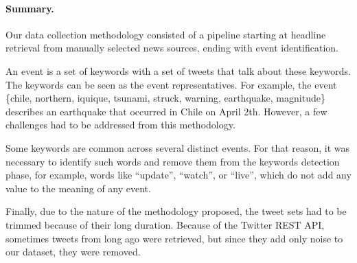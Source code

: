 \paragraph{Summary.}
%
Our data collection methodology consisted of a pipeline starting at headline
retrieval from manually selected news sources, ending with event identification.

An event is a set of keywords with a set of tweets that talk about these
keywords.
%
The keywords can be seen as the event representatives. 
%
For example, the event \{chile, northern, iquique, tsunami, struck, warning,
earthquake, magnitude\} describes an earthquake that occurred in Chile on April
2th. 
%
However, a few challenges had to be addressed from this methodology.

Some keywords are common across several distinct events. 
%
For that reason, it was necessary to identify such words and remove them from
the keywords detection phase, for example, words like ``update'', ``watch'', or
``live'', which do not add any value to the meaning of any event. 

Finally, due to the nature of the methodology proposed, the tweet sets had to be
trimmed because of their long duration. 
%
Because of the Twitter REST API, sometimes tweets from long ago were retrieved,
but since they add only noise to our dataset, they were removed.

